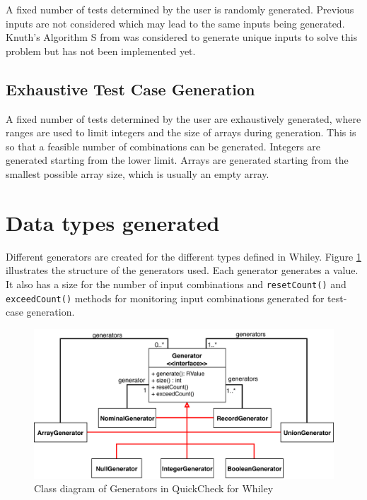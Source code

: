 A fixed number of tests determined by the user is randomly generated. Previous inputs are not considered which may lead to the same inputs being generated.
Knuth's Algorithm S from \cite{artProgv2} was considered to generate unique inputs to solve this problem but has not been implemented yet.

\subsection{Exhaustive Test Case Generation}
A fixed number of tests determined by the user are exhaustively generated, where ranges are used to limit integers and the size of arrays during generation. This is so that a feasible number of combinations can be generated. Integers are generated starting from the lower limit. Arrays are generated starting from the smallest possible array size, which is usually an empty array.

\section{Data types generated}
Different generators are created for the different types defined in Whiley. 
Figure \ref{fig:qc-generators} illustrates the structure of the generators used.
Each generator generates a value. It also has a size for the number of input combinations and \texttt{resetCount()} and \texttt{exceedCount()} methods for monitoring input combinations generated for test-case generation.
 
\begin{figure}
	\label{fig:qc-generators}
	\includegraphics[width=\textwidth]{qc-generators}
	\centering
	\caption{Class diagram of Generators in QuickCheck for Whiley}
\end{figure}

